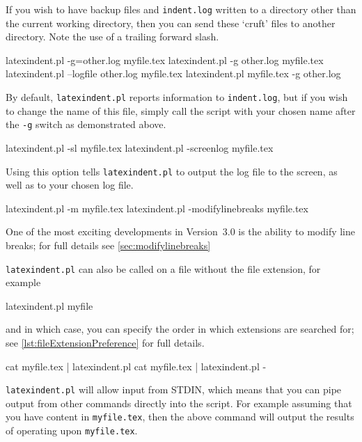 	If you wish to have backup files and \texttt{indent.log} written to a directory other
	than the current working directory, then you can send these `cruft' files to another
	directory. Note the use of a trailing forward slash. %

	\begin{commandshell}
latexindent.pl -g=other.log myfile.tex
latexindent.pl -g other.log myfile.tex
latexindent.pl --logfile other.log myfile.tex
latexindent.pl myfile.tex -g other.log 
\end{commandshell}

	By default, \texttt{latexindent.pl} reports information to \texttt{indent.log}, but
	if you wish to change the name of this file, simply call the script with your chosen name
	after the \texttt{-g} switch as demonstrated above.

	\begin{commandshell}
latexindent.pl -sl myfile.tex
latexindent.pl -screenlog myfile.tex
\end{commandshell}
	Using this%
	 option tells
	\texttt{latexindent.pl} to output the log file to the screen, as well as to your chosen
	log file.

	\begin{commandshell}
latexindent.pl -m myfile.tex
latexindent.pl -modifylinebreaks myfile.tex
\end{commandshell}

	One of the most exciting developments in Version~3.0 is the ability to modify line
	breaks; for full details see \vref{sec:modifylinebreaks}

	\texttt{latexindent.pl} can also be called on a file without the file extension, for
	example
	\begin{commandshell}
latexindent.pl myfile
\end{commandshell}
	and in which case, you can specify the order in which extensions are searched for; see
	\vref{lst:fileExtensionPreference} for full details.
	\begin{commandshell}
cat myfile.tex | latexindent.pl
cat myfile.tex | latexindent.pl -
\end{commandshell}
	\texttt{latexindent.pl} will%
	 allow input from STDIN, which means that you can pipe output from
	other commands directly into the script. For example assuming that you have content in
	\texttt{myfile.tex}, then the above command will output the results of operating upon
	\texttt{myfile.tex}.

